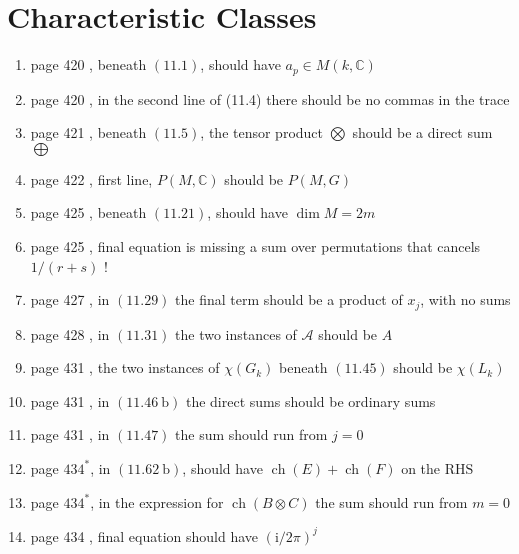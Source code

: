 \documentclass{article}
\begin{document}
\section*{Characteristic Classes}
\begin{enumerate}
\item page 420 , beneath $(11.1)$, should have $a_{p} \in M(k, \mathbb{C})$

\item page 420 , in the second line of (11.4) there should be no commas in the trace

\item page 421 , beneath $(11.5)$, the tensor product $\bigotimes$ should be a direct sum $\bigoplus$

\item page 422 , first line, $P(M, \mathbb{C})$ should be $P(M, G)$

\item page 425 , beneath $(11.21)$, should have $\operatorname{dim} M=2 m$

\item page 425 , final equation is missing a sum over permutations that cancels $1 /(r+s)$ !

\item page 427 , in $(11.29)$ the final term should be a product of $x_{j}$, with no sums

\item page 428 , in $(11.31)$ the two instances of $\mathcal{A}$ should be $A$

\item page 431 , the two instances of $\chi\left(G_{k}\right)$ beneath $(11.45)$ should be $\chi\left(L_{k}\right)$

\item page 431 , in $(11.46 \mathrm{~b})$ the direct sums should be ordinary sums

\item page 431 , in $(11.47)$ the sum should run from $j=0$

\item page $434^{*}$, in $(11.62 \mathrm{~b})$, should have $\operatorname{ch}(E)+\operatorname{ch}(F)$ on the $\mathrm{RHS}$

\item page $434^{*}$, in the expression for $\operatorname{ch}(B \otimes C)$ the sum should run from $m=0$

\item page 434 , final equation should have $(\mathrm{i} / 2 \pi)^{j}$


\end{enumerate}
\end{document}
